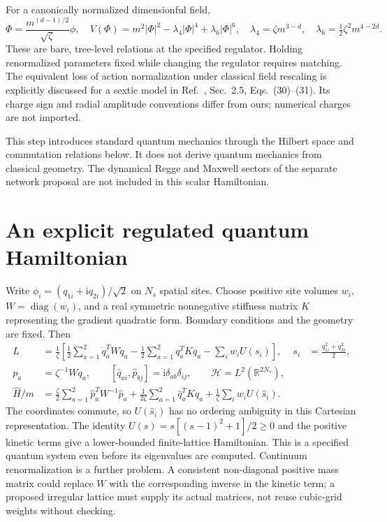 \documentclass[11pt,a4paper]{article}
\newcommand{\ii}{\mathrm i}
\newcommand{\R}{\mathbb R}
\begin{document}
For a canonically normalized dimensionful field,
\begin{equation}\label{eq:rescale}
 \Phi=\frac{m^{(d-1)/2}}{\sqrt\zeta}\phi,
 \quad V(\Phi)=m^2|\Phi|^2-\lambda_4|\Phi|^4+\lambda_6|\Phi|^6,
 \quad \lambda_4=\zeta m^{3-d},\quad
 \lambda_6=\tfrac12\zeta^2m^{4-2d}.
\end{equation}
These are bare, tree-level relations at the specified regulator. Holding
renormalized parameters fixed while changing the regulator requires matching.
The equivalent loss of action normalization under classical field rescaling
is explicitly discussed for a sextic model in Ref.~\cite{xie}, Sec.~2.5,
Eqs.~(30)--(31). Its charge sign and radial amplitude conventions differ
from ours; numerical charges are not imported.

This step introduces standard quantum mechanics through the Hilbert space
and commutation relations below. It does not derive quantum mechanics from
classical geometry. The dynamical Regge and Maxwell sectors of the separate
network proposal are not included in this scalar Hamiltonian.

\section{An explicit regulated quantum Hamiltonian}
Write $\phi_i=(q_{1i}+\ii q_{2i})/\sqrt2$ on $N_s$ spatial sites. Choose
positive site volumes $w_i$, $W=\operatorname{diag}(w_i)$, and a real symmetric
nonnegative stiffness matrix $K$ representing the gradient quadratic form.
Boundary conditions and the geometry are fixed. Then
\begin{align}
 L&=\frac1\zeta\left[\frac12\sum_{a=1}^2\dot q_a^T W\dot q_a
 -\frac12\sum_{a=1}^2q_a^TKq_a-\sum_iw_iU(s_i)\right],
 &s_i&=\frac{q_{1i}^2+q_{2i}^2}{2},\\
 p_a&=\zeta^{-1}W\dot q_a,\qquad
 [\hat q_{ai},\hat p_{bj}]=\ii\delta_{ab}\delta_{ij},\qquad
 \mathcal H=L^2(\R^{2N_s}),\\
 \hat H/m&=\frac\zeta2\sum_{a=1}^2\hat p_a^TW^{-1}\hat p_a
 +\frac1{2\zeta}\sum_{a=1}^2\hat q_a^TK\hat q_a
 +\frac1\zeta\sum_iw_iU(\hat s_i).\label{eq:ham}
\end{align}
The coordinates commute, so $U(\hat s_i)$ has no ordering ambiguity in this
Cartesian representation. The identity
$U(s)=s[(s-1)^2+1]/2\geq0$ and the positive kinetic terms give a lower-bounded
finite-lattice Hamiltonian. This is a specified quantum system even before
its eigenvalues are computed. Continuum renormalization is a further problem.
A consistent non-diagonal positive mass matrix could replace $W$ with the
corresponding inverse in the kinetic term; a proposed irregular lattice must
supply its actual matrices, not reuse cubic-grid weights without checking.
\end{document}
